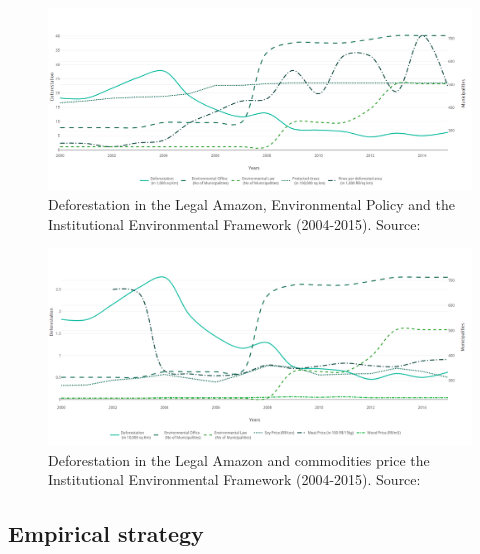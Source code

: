 \begin{landscape}

\begin{figure}[ht]
  \centering
  \includegraphics[width=1\linewidth, inner]{Figure1_policy_plot.png}
\caption{Deforestation in the Legal Amazon, Environmental Policy and the Institutional Environmental Framework (2004-2015). Source: \citep{inpe, MMMAwebsite, IBAMAwebsite}}
\label{fig:2}
\end{figure}

\begin{center}
\begin{figure}[ht]
  \includegraphics[width=1\linewidth]{Figure1_price_plot.png}
\caption{Deforestation in the Legal Amazon and commodities price the Institutional Environmental Framework (2004-2015). Source: \citep{inpe, IBGE1,CEPEA}}
\label{fig:3}
\end{figure}
\end{center}
\end{landscape}


\subsection{Empirical strategy}

